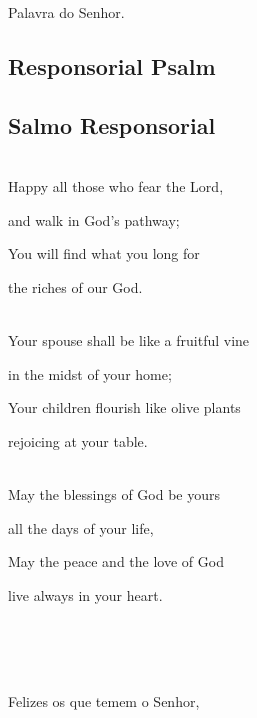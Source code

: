 \documentclass[10pt,a5]{article}
\newcommand \subsect[2] {\subsection*{#1} \switchcolumn \subsection*{#2} \switchcolumn*}
\begin{document}
\begin{paracol}{2}
Palavra do Senhor.\\


 \switchcolumn*

 \subsect{Responsorial Psalm}{Salmo Responsorial}

 \\

 Happy all those who fear the Lord,

 \hspace*{2em}and walk in God's pathway;

You will find what you long for

 \hspace*{2em}the riches of our God.

 \\

 Your spouse shall be like a fruitful vine

 \hspace*{2em}in the midst of your home;

 Your children flourish like olive plants

 \hspace*{2em}rejoicing at your table.

 \\

May the blessings of God be yours

 \hspace*{2em}all the days of your life,

 May the peace and the love of God

 \hspace*{2em}live always in your heart.

 \\


\switchcolumn

\\
\\

Felizes os que temem o Senhor,  


\end{paracol}
\end{document}

